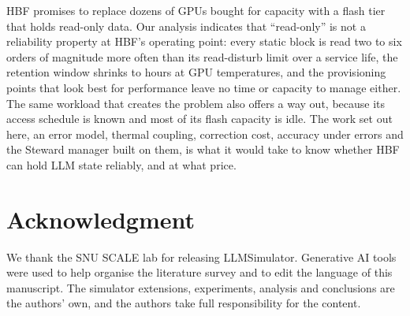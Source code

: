 \documentclass[conference,10pt]{IEEEtran}
\newcommand{\sys}{Steward}
\begin{document}
HBF promises to replace dozens of GPUs bought for capacity with a flash tier that
holds read-only data. Our analysis indicates that ``read-only'' is not a
reliability property at HBF's operating point: every static block is read two to
six orders of magnitude more often than its read-disturb limit over a service
life, the retention window shrinks to hours at GPU temperatures, and the
provisioning points that look best for performance leave no time or capacity to
manage either. The same workload that creates the problem also offers a way out,
because its access schedule is known and most of its flash capacity is idle. The
work set out here, an error model, thermal coupling, correction cost, accuracy
under errors and the \sys{} manager built on them, is what it would take to know
whether HBF can hold LLM state reliably, and at what price.

\section*{Acknowledgment}
We thank the SNU SCALE lab for releasing LLMSimulator. Generative AI tools were
used to help organise the literature survey and to edit the language of this
manuscript. The simulator extensions, experiments, analysis and conclusions are
the authors' own, and the authors take full responsibility for the content.
\end{document}
